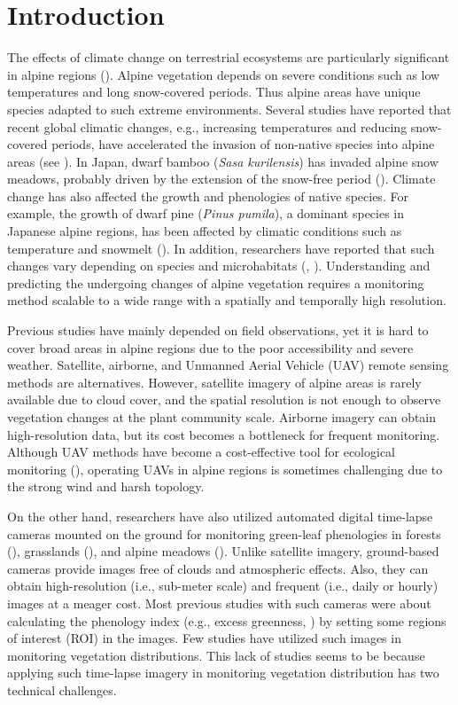 \documentclass{article}
\begin{document}
\hypertarget{introduction-1}{%
\section{Introduction}\label{introduction-1}}

The effects of climate change on terrestrial ecosystems are particularly significant in alpine regions (\cite{IPCC2007}). Alpine vegetation depends on severe conditions such as low temperatures and long snow-covered periods. Thus alpine areas have unique species adapted to such extreme environments. Several studies have reported that recent global climatic changes, e.g., increasing temperatures and reducing snow-covered periods, have accelerated the invasion of non-native species into alpine areas (see \cite{Alexander2016AlpBotany}). In Japan, dwarf bamboo (\emph{Sasa kurilensis}) has invaded alpine snow meadows, probably driven by the extension of the snow-free period (\cite{Kudo2011EcoEvo}). Climate change has also affected the growth and phenologies of native species. For example, the growth of dwarf pine (\emph{Pinus pumila}), a dominant species in Japanese alpine regions, has been affected by climatic conditions such as temperature and snowmelt (\cite{Amagai2015EcoRes}). In addition, researchers have reported that such changes vary depending on species and microhabitats (\cite{Kudo2010AAA}, \cite{XXXXXX}). Understanding and predicting the undergoing changes of alpine vegetation requires a monitoring method scalable to a wide range with a spatially and temporally high resolution.

Previous studies have mainly depended on field observations, yet it is hard to cover broad areas in alpine regions due to the poor accessibility and severe weather. Satellite, airborne, and Unmanned Aerial Vehicle (UAV) remote sensing methods are alternatives. However, satellite imagery of alpine areas is rarely available due to cloud cover, and the spatial resolution is not enough to observe vegetation changes at the plant community scale. Airborne imagery can obtain high-resolution data, but its cost becomes a bottleneck for frequent monitoring. Although UAV methods have become a cost-effective tool for ecological monitoring (\cite{Baena2017PLOSONE}), operating UAVs in alpine regions is sometimes challenging due to the strong wind and harsh topology.

On the other hand, researchers have also utilized automated digital time-lapse cameras mounted on the ground for monitoring green-leaf phenologies in forests (\cite{Richardson2009EcolAppl}), grasslands (\cite{Browning2017RemSen}), and alpine meadows (\cite{IdeOguma2013EcolInfom}). Unlike satellite imagery, ground-based cameras provide images free of clouds and atmospheric effects. Also, they can obtain high-resolution (i.e., sub-meter scale) and frequent (i.e., daily or hourly) images at a meager cost. Most previous studies with such cameras were about calculating the phenology index (e.g., excess greenness, \cite{Woebbecke1995ASAE}) by setting some regions of interest (ROI) in the images. Few studies have utilized such images in monitoring vegetation distributions. This lack of studies seems to be because applying such time-lapse imagery in monitoring vegetation distribution has two technical challenges.
\end{document}
